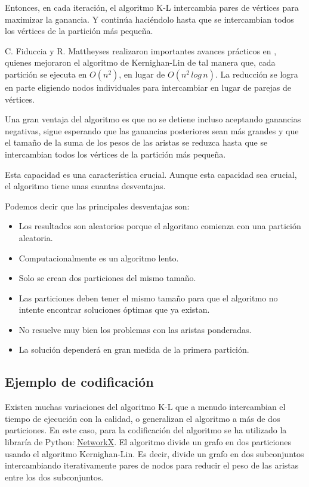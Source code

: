 Entonces, en cada iteración, el algoritmo K-L intercambia pares de vértices para maximizar la ganancia. Y continúa haciéndolo hasta que se intercambian todos los vértices de la partición más pequeña. 

C. Fiduccia y R. Mattheyses realizaron importantes avances prácticos en \cite{FiducciaMattheyses}, quienes mejoraron el algoritmo de  Kernighan-Lin\cite{KernighanLin} de tal manera que, cada partición se ejecuta en $O({n}^2)$, en lugar de $O({n}^2 \, log \, n)$. La reducción se logra en parte eligiendo nodos individuales para intercambiar en lugar de parejas de vértices.

Una gran ventaja del algoritmo es que no se detiene incluso aceptando ganancias negativas, sigue esperando que las ganancias posteriores sean más grandes y que el tamaño de la suma de los pesos de las aristas se reduzca hasta que se intercambian todos los vértices de la partición más pequeña. 

Esta capacidad es una característica crucial. Aunque esta capacidad sea crucial, el algoritmo tiene unas cuantas desventajas.

Podemos decir que las principales desventajas son:

\begin{itemize}
	\item Los resultados son aleatorios porque el algoritmo comienza con una partición aleatoria.
	\item Computacionalmente es un algoritmo lento.
	\item Solo se crean dos particiones del mismo tamaño.
	\item Las particiones deben tener el mismo tamaño para que el algoritmo no intente encontrar soluciones óptimas que ya existan.
	\item No resuelve muy bien los problemas con las aristas ponderadas.
	\item La solución dependerá en gran medida de la primera partición.
\end{itemize}

\subsection{Ejemplo de codificación}\label{Kernighan-Lin-ejemplo}

Existen muchas variaciones del algoritmo K-L que a menudo intercambian el tiempo de ejecución con la calidad, o generalizan el algoritmo a más de dos particiones. En este caso, para la codificación del algoritmo se ha utilizado la libraría de Python: \href{https://networkx.github.io/documentation/stable/reference/algorithms/generated/networkx.algorithms.community.kernighan_lin.kernighan_lin_bisection.html}{NetworkX}. El algoritmo divide un grafo en dos particiones usando el algoritmo Kernighan-Lin\cite{KernighanLin}. Es decir, divide un grafo en dos subconjuntos intercambiando iterativamente pares de nodos para reducir el peso de las aristas entre los dos subconjuntos.

